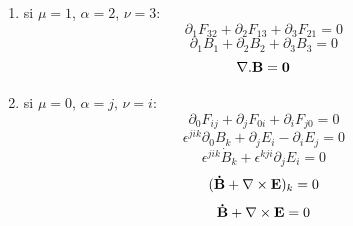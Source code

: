 \documentclass[a4paper,12pt]{article}
\begin{document}
\begin{enumerate}
 \item[\fbox{1.}] si $\mu=1$, $\alpha=2$, $\nu=3$:
\\
\begin{equation} 
\partial_1 F_{32}+\partial_2 F_{13}+\partial_3 F_{21}=0
\end{equation}
\begin{equation} 
\partial_1 B_1+\partial_2 B_2+\partial_3 B_3=0
\end{equation}
\begin{equation} 
{\bf \nabla.B=0}
\end{equation}
\item[\fbox{2.}] si $\mu=0$, $\alpha=j$, $\nu=i$:
\\\begin{equation} 
\partial_0 F_{ij}+\partial_j F_{0i}+\partial_i F_{j0}=0
\end{equation}
\begin{equation} 
\epsilon^{jik}\partial_0 B_k +\partial_j E_{i}-\partial_i E_{j}=0
\end{equation}
\begin{equation} 
\epsilon^{jik}\dot B_k+\epsilon^{kji}\partial_j E_{i}=0
\end{equation}
\begin{equation} 
( {\bf\dot B}+\nabla \times {\bf E})_k=0
\end{equation}
\begin{equation} 
{\bf\dot B}+\nabla \times {\bf E}=0
\end{equation}
\end{enumerate}
\vspace{0,4cm}

\\
\end{document}
